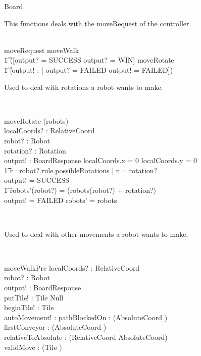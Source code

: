 \documentclass[12pt]{article}
\begin{document}
\begin{class}{Board}
\begin{classcom}
This functions deals with the moveRequest of the controller
\end{classcom} \\
moveRequest \sdef moveWalk \; \; \comp \\ \t1 ([output? = SUCCESS \vee output? = WIN] \wedge moveRotate \; \; [] \\ \t1 [output! : \bool | output? = FAILED \wedge output! = FAILED]) \\
\begin{classcom}
Used to deal with rotations a robot wants to make.
\end{classcom} \\
\begin{schema}{moveRotate}
\Delta(robots) \\
localCoords? : RelativeCoord \\
robot? : Robot \\
rotation? : Rotation \\
output! : BoardResponse
\where
\IF localCoords.x = 0 \wedge localCoords.y = 0 \; \; \wedge \\ \t1
 \exists r : robot?.rule.possibleRotations | r = rotation?\\
\THEN output! = SUCCESS \; \; \wedge \\ \t1
robots'(robot?) = (robots(robot?) + rotation?)  \\
\ELSE output! = FAILED \wedge robots' = robots
\end{schema} \\
\begin{classcom}
Used to deal with other movements a robot wants to make.
\end{classcom} \\
\znewpage
\begin{schema}{moveWalkPre}
localCoords? : RelativeCoord \\
robot? : Robot \\
output! : BoardResponse \\
putTile! : Tile \cup Null \\
beginTile! : Tile \\
autoMovement! : \bool
\also \also \also
pathBlockedOn : \power (\seq AbsoluteCoord \fun \nat) \\
firstConveyor : \power (\seq AbsoluteCoord \fun \nat) \\
relativeToAbsolute : \power (\seq RelativeCoord \pfun \seq AbsoluteCoord) \\
validMove : \power (Tile \fun \bool) \\

\end{schema}
\end{class}
\end{document}
